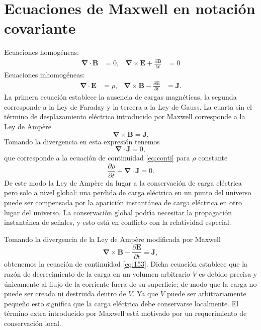 \section{Ecuaciones de Maxwell en notaci\'on covariante }
\label{sec:maxeqs}
Ecuaciones homog\'eneas:
\begin{align}
  \label{eq:hom_m_eq}
  \boldsymbol{\nabla}\cdot\mathbf{B}&=0,&\boldsymbol{\nabla}\times\mathbf{E}+\frac{\partial\mathbf{B}}{\partial t}&=0
\end{align}
Ecuaciones inhomog\'eneas:
\begin{align}
  \label{eq:inhom_m_eq}
  \boldsymbol{\nabla}\cdot\mathbf{E}&=\rho,&\boldsymbol{\nabla}\times\mathbf{B}-\frac{\partial\mathbf{E}}{\partial t}&=\mathbf{J}.
\end{align}
La primera ecuaci\'on establece la ausencia de cargas magn\'eticas, la segunda corresponde a la Ley de Faraday y la tercera a la Ley de Gauss. La cuarta sin el t\'ermino de desplazamiento el\'ectrico introducido por Maxwell corresponde a la Ley de Amp\`ere
\begin{equation}
   \boldsymbol{\nabla}\times\mathbf{B}=\mathbf{J}.
\end{equation}
Tomando la divergencia en esta expresi\'on tenemos
\begin{equation}
  \boldsymbol{\nabla}\cdot\mathbf{J}=0,
\end{equation}
que corresponde a la ecuaci\'on de continuidad \eqref{eq:conti} para $\rho$ constante
\begin{equation}
  \label{eq:153}
  \frac{\partial \rho}{\partial t}+\boldsymbol{\nabla}\cdot\mathbf{J}=0.
\end{equation}
De este modo la Ley de Amp\`ere da lugar a la conservaci\'on de carga el\'ectrica pero solo a nivel global:  una perdida de carga el\'ectrica en un punto del universo puede ser compensada por la aparici\'on instant\'anea de carga el\'ectrica en otro lugar del universo. La conservaci\'on global podr\'\i a necesitar la propagaci\'on instant\'anea de se\~nales, y esto est\'a en conflicto con la relatividad especial.


Tomando la divergencia de la Ley de Amp\`ere modificada por Maxwell
\begin{equation}
   \boldsymbol{\nabla}\times\mathbf{B}-\frac{\partial\mathbf{E}}{\partial t}=\mathbf{J},
\end{equation}
obtenemos la ecuaci\'on de continuidad \eqref{eq:153}. Dicha ecuaci\'on establece que la raz\'on de decrecimiento de la carga en un volumen arbitrario $V$ es debido precisa y \'unicamente al flujo de la corriente fuera de su superficie; de modo que la carga no puede ser creada ni destruida dentro de $V$.  Ya que $V$ puede ser arbitrariamente peque\~no esto significa que la carga el\'ectrica debe conservarse localmente.   El t\'ermino extra introducido por Maxwell est\'a motivado por un requerimiento de conservaci\'on local. 

